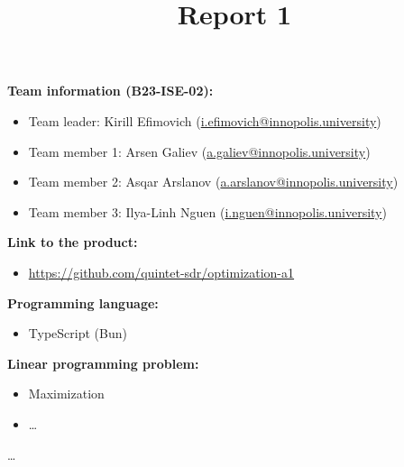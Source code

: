 \documentclass{article}
\title{\textbf{Report 1}}
\author{}
\date{}
\begin{document}
\maketitle

\thispagestyle{fancy}

\textbf{Team information (B23-ISE-02):}
\begin{itemize}[label=-]
    \item Team leader: Kirill Efimovich (\href{mailto:k.efimovich@innopolis.university}{i.efimovich@innopolis.university})
    \item Team member 1: Arsen Galiev (\href{mailto:a.galiev@innopolis.university}{a.galiev@innopolis.university})
    \item Team member 2: Asqar Arslanov (\href{mailto:a.arslanov@innopolis.university}{a.arslanov@innopolis.university})
    \item Team member 3: Ilya-Linh Nguen (\href{mailto:i.nguen@innopolis.university}{i.nguen@innopolis.university})
\end{itemize}

\textbf{Link to the product:}
\begin{itemize}[label=-]
    \item \url{https://github.com/quintet-sdr/optimization-a1}
\end{itemize}

\textbf{Programming language:}
\begin{itemize}[label=-]
    \item TypeScript (Bun)
\end{itemize}

\textbf{Linear programming problem:}
\begin{itemize}[label=-]
    \item Maximization
    \item \dots
\end{itemize}

\dots
\end{document}
